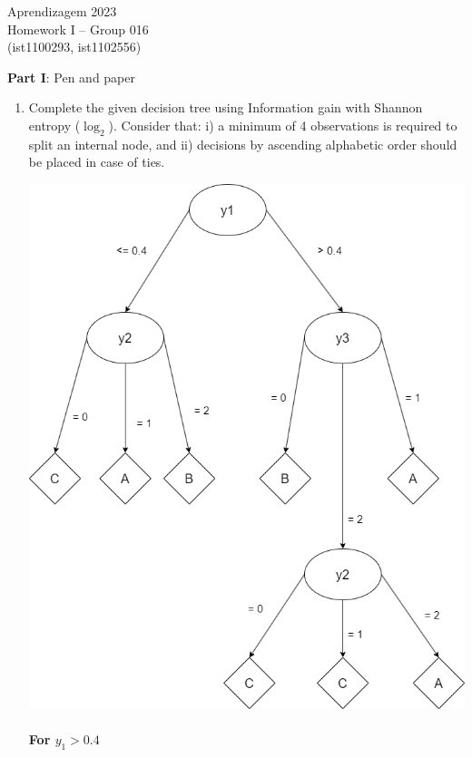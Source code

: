 \documentclass[12pt]{article}
\begin{document}
\center
Aprendizagem 2023\\
Homework I -- Group 016\\
(ist1100293, ist1102556)\vskip 1cm

\large{\textbf{Part I}: Pen and paper}\normalsize

\begin{enumerate}[leftmargin=\labelsep]
\item Complete the given decision tree using Information gain with Shannon entropy ($\log_2$).
Consider that: i) a minimum of 4 observations is required to split an internal node, and
ii) decisions by ascending alphabetic order should be placed in case of ties.
 
\begin{center}
    \includegraphics[scale=0.3]{images/decision-tree.png}
\end{center}

\paragraph{For $y_1 > 0.4$}


\end{enumerate}
\end{document}
